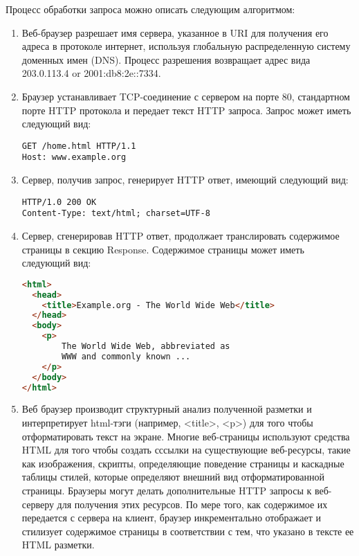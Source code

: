 Процесс обработки запроса можно описать следующим алгоритмом:
\begin{enumerate}[label=\arabic*.]
\item Веб-браузер разрешает имя сервера, указанное в URI для получения его адреса в протоколе интернет, используя глобальную распределенную систему доменных имен (DNS).
Процесс разрешения возвращает адрес вида 203.0.113.4 or 2001:db8:2e::7334.
\item{Браузер устанавливает TCP-соединение с сервером на порте 80, стандартном порте HTTP протокола и передает текст HTTP запроса. Запрос может иметь следующий вид:
\begin{lstlisting}[language=HTTP_HEADERS, label=lst:domain:http-request]
GET /home.html HTTP/1.1
Host: www.example.org
\end{lstlisting}
}
\item{Сервер, получив запрос, генерирует HTTP ответ, имеющий следующий вид: 
\begin{lstlisting}[language=HTTP_HEADERS, label=lst:domain:http-response]
HTTP/1.0 200 OK
Content-Type: text/html; charset=UTF-8
\end{lstlisting}
}
\item{Сервер, сгенерировав HTTP ответ, продолжает транслировать содержимое страницы в секцию Response. Содержимое страницы может иметь следующий вид: 
\begin{lstlisting}[language=HTML, label=lst:domain:html]
<html>
  <head>
    <title>Example.org - The World Wide Web</title>
  </head>
  <body>
    <p>
        The World Wide Web, abbreviated as
        WWW and commonly known ...
    </p>
  </body>
</html>
\end{lstlisting}
}
\item{Веб браузер производит структурный анализ полученной разметки и интерпретирует html-тэги (например, <title>, <p>) для того чтобы отформатировать текст на экране.
Многие веб-страницы используют средства HTML для того чтобы создать сссылки на существующие веб-ресурсы, такие как изображения, скрипты, определяющие поведение страницы и
каскадные таблицы стилей, которые определяют внешний вид отформатированной страницы. Браузеры могут делать дополнительные HTTP запросы к веб-серверу для получения этих
ресурсов. По мере того, как содержимое их передается с сервера на клиент, браузер инкрементально отображает и стилизует содержимое страницы в соответствии с тем, что указано
в тексте ее HTML разметки.
}
\end{enumerate}

